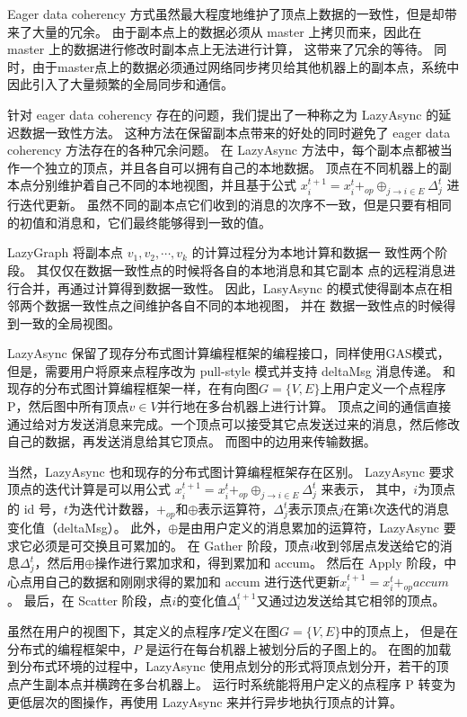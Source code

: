 Eager data coherency 方式虽然最大程度地维护了顶点上数据的一致性，但是却带来了大量的冗余。
由于副本点上的数据必须从 master 上拷贝而来，因此在 master 上的数据进行修改时副本点上无法进行计算，
这带来了冗余的等待。
同时，由于master点上的数据必须通过网络同步拷贝给其他机器上的副本点，系统中因此引入了大量频繁的全局同步和通信。

针对 eager data coherency 存在的问题，我们提出了一种称之为 LazyAsync 的延迟数据一致性方法。
这种方法在保留副本点带来的好处的同时避免了 eager data coherency 方法存在的各种冗余问题。
在 LazyAsync 方法中，每个副本点都被当作一个独立的顶点，并且各自可以拥有自己的本地数据。
顶点在不同机器上的副本点分别维护着自己不同的本地视图，并且基于公式
$x_{i}^{t+1}=x_{i}^{t}+_{o p} \oplus_{j \rightarrow i \in E} \Delta_{j}^{t}$
进行迭代更新。
虽然不同的副本点它们收到的消息的次序不一致，但是只要有相同的初值和消息和，它们最终能够得到一致的值。

LazyGraph 将副本点 $v_1 , v_2 , \cdots , v_k$ 的计算过程分为本地计算和数据一 致性两个阶段。
其仅仅在数据一致性点的时候将各自的本地消息和其它副本 点的远程消息进行合并，再通过计算得到数据一致性。
因此，LasyAsync 的模式使得副本点在相邻两个数据一致性点之间维护各自不同的本地视图，
并在 数据一致性点的时候得到一致的全局视图。


LazyAsync 保留了现存分布式图计算编程框架的编程接口，同样使用GAS模式，
但是，需要用户将原来点程序改为 pull-style 模式并支持 deltaMsg 消息传递。
和现存的分布式图计算编程框架一样，在有向图$G = \{V, E\}$上用户定义一个点程序 P，然后图中所有顶点$v \in V$并行地在多台机器上进行计算。
顶点之间的通信直接通过给对方发送消息来完成。一个顶点可以接受其它点发送过来的消息，然后修改自己的数据，再发送消息给其它顶点。
而图中的边用来传输数据。


当然，LazyAsync 也和现存的分布式图计算编程框架存在区别。
LazyAsync 要求顶点的迭代计算是可以用公式 $x_i^{t+1} = x_i^t +_{op} \oplus_{j \rightarrow i \in E} \Delta_j^t$ 来表示，
其中，$i$为顶点的 id 号，$t$为迭代计数器，$+_{op}$和$\oplus$表示运算符，$\Delta_j^t$表示顶点$j$在第t次迭代的消息变化值（deltaMsg）。
此外，$\oplus$是由用户定义的消息累加的运算符，LazyAsync 要求它必须是可交换且可累加的。
在 Gather 阶段，顶点$i$收到邻居点发送给它的消息$\Delta_j^t$，然后用$\oplus$操作进行累加求和，得到累加和 accum。
然后在 Apply 阶段，中心点用自己的数据和刚刚求得的累加和 accum 进行迭代更新$x_i^{t+1} = x_i^t +_{op} accum$。
最后，在 Scatter 阶段，点$i$的变化值$\Delta_i^{t+1}$又通过边发送给其它相邻的顶点。


虽然在用户的视图下，其定义的点程序$P$定义在图$G = \{V,E\}$中的顶点上，
但是在分布式的编程框架中，$P$ 是运行在每台机器上被划分后的子图上的。
在图的加载到分布式环境的过程中，LazyAsync 使用点划分的形式将顶点划分开，若干的顶点产生副本点并横跨在多台机器上。
运行时系统能将用户定义的点程序 P 转变为更低层次的图操作，再使用 LazyAsync 来并行异步地执行顶点的计算。

